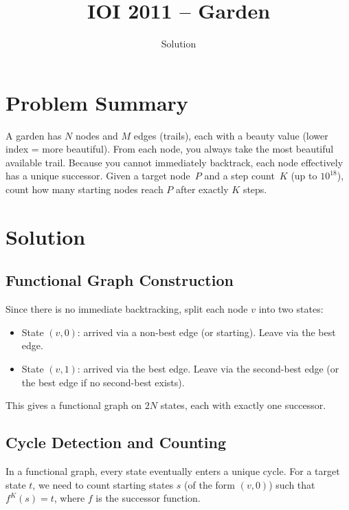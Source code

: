 \documentclass[11pt,a4paper]{article}
\title{IOI 2011 -- Garden}
\author{Solution}
\date{}
\begin{document}
\maketitle

\section{Problem Summary}
A garden has $N$ nodes and $M$ edges (trails), each with a beauty value (lower index = more beautiful). From each node, you always take the most beautiful available trail. Because you cannot immediately backtrack, each node effectively has a unique successor. Given a target node~$P$ and a step count~$K$ (up to $10^{18}$), count how many starting nodes reach $P$ after exactly $K$ steps.

\section{Solution}

\subsection{Functional Graph Construction}
Since there is no immediate backtracking, split each node $v$ into two states:
\begin{itemize}
    \item State $(v, 0)$: arrived via a non-best edge (or starting). Leave via the best edge.
    \item State $(v, 1)$: arrived via the best edge. Leave via the second-best edge (or the best edge if no second-best exists).
\end{itemize}
This gives a functional graph on $2N$ states, each with exactly one successor.

\subsection{Cycle Detection and Counting}
In a functional graph, every state eventually enters a unique cycle. For a target state $t$, we need to count starting states $s$ (of the form $(v, 0)$) such that $f^K(s) = t$, where $f$ is the successor function.
\end{document}
